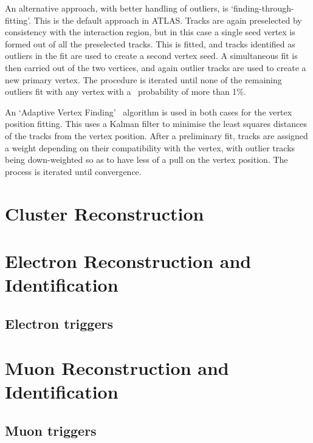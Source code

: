 An alternative approach, with better handling of outliers, is
`finding-through-fitting'. This is the default approach in ATLAS. Tracks are
again preselected by consistency with the interaction region, but in this case a
single seed vertex is formed out of all the preselected tracks. This is fitted, and
tracks identified as outliers in the fit are used to create a second vertex
seed. A simultaneous fit is then carried out of the two vertices, and again
outlier tracks are used to create a new primary vertex. The procedure is
iterated until none of the remaining outliers fit with any vertex with a
\chisquared\ probability of more than 1\%.

An `Adaptive Vertex Finding'~\cite{0954-3899-34-12-N01} algorithm is used in
both cases for the vertex position fitting. 
This uses a Kalman filter to minimise the least squares distances of the tracks from
the vertex position. After a preliminary fit, tracks are assigned a
weight depending on their compatibility with the vertex, with outlier tracks
being down-weighted so as to have less of a pull on the vertex position. The
process is iterated until convergence.

\section{Cluster Reconstruction}
\label{sec:reco-clustering}

\section{Electron Reconstruction and Identification}
\label{sec:reco-el}

\subsection{Electron triggers}
\label{sec:reco-el-triggers}

\section{Muon Reconstruction and Identification}
\label{sec:reco-mu}

\subsection{Muon triggers}
\label{sec:reco-mu-triggers}
